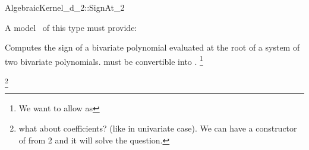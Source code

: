 \begin{ccRefConcept}{AlgebraicKernel_d_2::SignAt_2}

\ccDefinition


A model \ccVar\ of this type must provide:

{Computes the sign of a bivariate polynomial  evaluated at the root 
 of a system of two bivariate polynomials.
 must be convertible into .} 
\footnote{We want to allow  as }

\footnote{what about coefficients? (like in univariate case). We can have 
a constructor of  from 2  and it 
will solve the question.}

\end{ccRefConcept}

